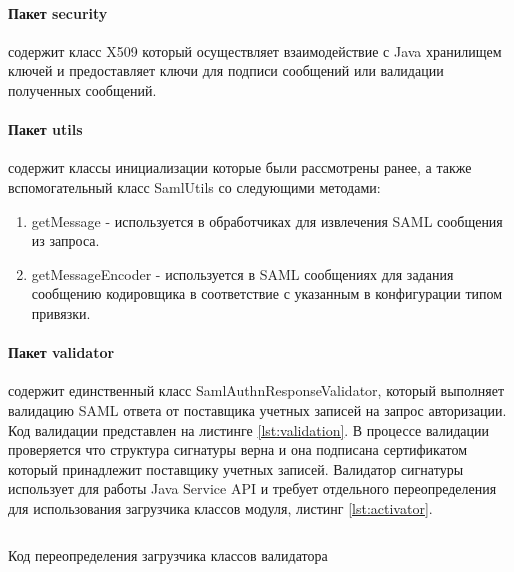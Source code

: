 \paragraph{Пакет security} содержит класс X509 который осуществляет взаимодействие с Java хранилищем ключей и предоставляет ключи для подписи сообщений или валидации полученных сообщений.
\paragraph{Пакет utils} содержит классы инициализации которые были рассмотрены ранее, а также вспомогательный класс SamlUtils со следующими методами:
\begin{enumerate}
\item getMessage - используется в обработчиках для извлечения SAML сообщения из запроса.
\item getMessageEncoder - используется в SAML сообщениях для задания сообщению кодировщика в соответствие с указанным в конфигурации типом  привязки.
\end{enumerate}
\paragraph{Пакет validator} содержит единственный класс SamlAuthnResponseValidator, который выполняет валидацию SAML ответа от поставщика учетных записей на запрос авторизации. Код валидации представлен на листинге \ref{lst:validation}. В процессе валидации проверяется что структура сигнатуры верна и она подписана сертификатом который принадлежит поставщику учетных записей. Валидатор сигнатуры использует для работы Java Service API и требует отдельного переопределения для использования загрузчика классов модуля, листинг \ref{lst:activator}.

\begin{longlisting}
\inputminted[linenos,frame=single]{java}{inc/src/validatorLoader}
\caption{Код переопределения загрузчика классов валидатора} 
\label{lst:validatorLoader}
\end{longlisting}

